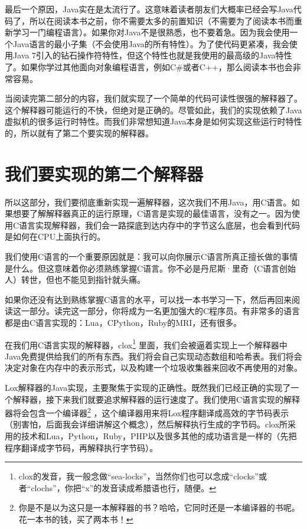 \documentclass[cn,10pt,math=newtx,citestyle=gb7714-2015,bibstyle=gb7714-2015]{elegantbook}
\begin{document}
最后一个原因，Java实在是太流行了。这意味着读者朋友们大概率已经会写Java代码了，所以在阅读本书之前，你不需要太多的前置知识（不需要为了阅读本书而重新学习一门编程语言）。如果你对Java不是很熟悉，也不要着急。因为我会使用一个Java语言的最小子集（不会使用Java的所有特性）。为了使代码更紧凑，我会使用Java 7引入的钻石操作符特性，但这个特性也就是我使用的最高级的Java特性了。如果你学过其他面向对象编程语言，例如C\#或者C++，那么阅读本书也会非常容易。

当阅读完第二部分的内容，我们就实现了一个简单的代码可读性很强的解释器了。这个解释器可能运行的不快，但绝对是正确的。尽管如此，我们的实现依赖了Java虚拟机的很多运行时特性。而我们非常想知道Java本身是如何实现这些运行时特性的，所以就有了第二个要实现的解释器。

\section{我们要实现的第二个解释器}

所以这部分，我们要彻底重新实现一遍解释器，这次我们不用Java，用C语言。如果想要了解解释器真正的运行原理，C语言是实现的最佳语言，没有之一。因为使用C语言实现解释器，我们会一路探底到达内存中的字节这么底层，也会看到代码是如何在CPU上面执行的。

我们使用C语言的一个重要原因就是：我可以向你展示C语言所真正擅长做的事情是什么。但这意味着你必须熟练掌握C语言。你不必是丹尼斯·里奇（C语言创始人）转世，但也不能见到指针就头痛。

如果你还没有达到熟练掌握C语言的水平，可以找一本书学习一下，然后再回来阅读这一部分。读完这一部分，你将成为一名更加强大的C程序员。有非常多的语言都是由C语言实现的：Lua，CPython，Ruby的MRI，还有很多。

在我们用C语言实现的解释器，clox\footnote{clox的发音，我一般念做“sea-locks”，当然你们也可以念成“clocks”或者“clochs”，你把“x”的发音读成希腊语也行，随便。} 里面，我们会被逼着实现上一个解释器中Java免费提供给我们的所有东西。我们将会自己实现动态数组和哈希表。我们将会决定对象在内存中的表示形式，以及构建一个垃圾收集器来回收不再使用的对象。

Lox解释器的Java实现，主要聚焦于实现的正确性。既然我们已经正确的实现了一个解释器，接下来我们就要追求解释器的运行速度了。我们使用C语言实现的解释器将会包含一个编译器\footnote{你是不是以为这只是一本解释器的书？哈哈，它同时还是一本编译器的书呢。花一本书的钱，买了两本书！} ，这个编译器用来将Lox程序翻译成高效的字节码表示（别害怕，后面我会详细讲解这个概念），然后解释执行生成的字节码。clox所采用的技术和Lua，Python，Ruby，PHP以及很多其他的成功语言是一样的（先把程序翻译成字节码，再解释执行字节码）。
\end{document}
